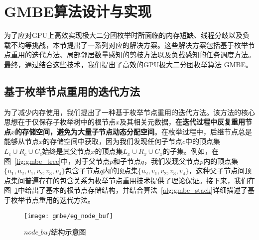 

\section{GMBE算法设计与实现}
为了应对GPU上高效实现极大二分团枚举时所面临的内存短缺、线程分歧以及负载不均等挑战，本节提出了一系列对应的解决方案。这些解决方案包括基于枚举节点重用的迭代方法、局部邻居数量感知的剪枝方法以及负载感知的任务调度方法。最终，通过结合这些技术，我们提出了高效的GPU极大二分团枚举算法 GMBE。


\subsection{基于枚举节点重用的迭代方法}
\label{subsec:gmbe_memory}


为了减少内存使用，我们提出了一种基于枚举节点重用的迭代方法。该方法的核心思想在于仅保存子枚举树中的根节点$x$及其相关元数据，\textbf{在迭代过程中反复重用节点$x$的存储空间，避免为大量子节点动态分配空间}。在枚举过程中，后继节点总是能够从节点$x$的存储空间中获取，因为我们发现任何子节点$c$中的顶点集$L_c \cup R_c \cup C_c$始终是其父节点$x$的顶点集$L_x\cup R_x\cup C_x$的子集。例如，在图~\ref{fig:gmbe_tree}中，对于父节点$p$和子节点$q$，我们发现父节点$p$内的顶点集$\{u_1, u_2, v_1, v_2, v_3, v_4\}$包含子节点$q$内的顶点集$\{u_2, v_1, v_2, v_3, v_4\}$，这种父子节点间顶点集间普遍存在的包含关系为枚举节点重用技术提供了理论保证。接下来，我们在图~\ref{fig:gmbe_node_buf}中给出了基本的根节点存储结构，并结合算法~\ref{alg:gmbe_stack}详细描述了基于枚举节点重用的迭代方法。




\begin{figure} [H]
  \center
    \texttt{[image: gmbe/eg\_node\_buf]}
  \caption{$node\_buf$结构示意图}
  \label{fig:gmbe_node_buf}
\end{figure}


